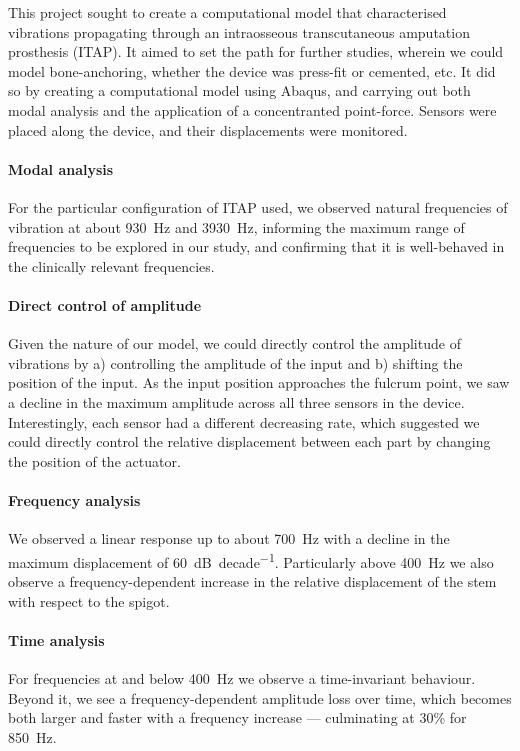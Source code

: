 This project sought to create a computational model that characterised vibrations propagating through an intraosseous transcutaneous amputation prosthesis (ITAP).
It aimed to set the path for further studies, wherein we could model bone-anchoring, whether the device was press-fit or cemented, etc.
It did so by creating a computational model using Abaqus, and carrying out both modal analysis and the application of a concentranted point-force.
Sensors were placed along the device, and their displacements were monitored.

\paragraph{Modal analysis}
For the particular configuration of ITAP used, we observed natural frequencies of vibration at about \SI{930}{Hz} and \SI{3930}{Hz}, informing the maximum range of frequencies to be explored in our study, and confirming that it is well-behaved in the clinically relevant frequencies.

\paragraph{Direct control of amplitude}
Given the nature of our model, we could directly control the amplitude of vibrations by a) controlling the amplitude of the input and b) shifting the position of the input.
As the input position approaches the fulcrum point, we saw a decline in the maximum amplitude across all three sensors in the device.
Interestingly, each sensor had a different decreasing rate, which suggested we could directly control the relative displacement between each part by changing the position of the actuator. 

\paragraph{Frequency analysis}
We observed a linear response up to about \SI{700}{Hz} with a decline in the maximum displacement of \SI{60}{\deci\bel\per decade}. Particularly above \SI{400}{Hz} we also observe a frequency-dependent increase in the relative displacement of the stem with respect to the spigot.

\paragraph{Time analysis}
For frequencies at and below \SI{400}{Hz} we observe a time-invariant behaviour.
Beyond it, we see a frequency-dependent amplitude loss over time, which becomes both larger and faster with a frequency increase --- culminating at 30\% for \SI{850}{Hz}.